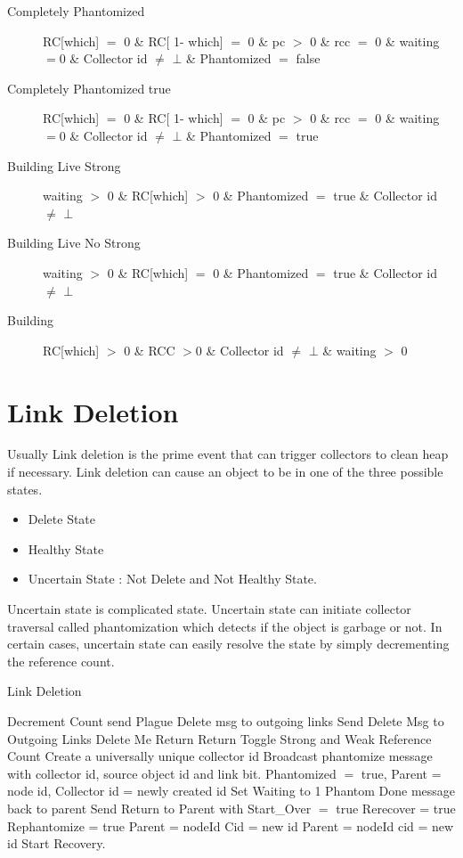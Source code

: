 \documentclass{article}
\begin{document}
\begin{description}
\item[Completely Phantomized] RC[which] $=$ 0 \& RC[ 1- which] $=$ 0 \& pc $>$ 0 \& rcc $=$ 0 \& waiting $=$0 \& Collector id $\neq$ $\bot$ \& Phantomized $=$ false
\item[Completely Phantomized true] RC[which] $=$ 0 \& RC[ 1- which] $=$ 0 \& pc $>$ 0 \& rcc $=$ 0 \& waiting $=$0 \& Collector id $\neq$ $\bot$ \& Phantomized $=$ true
\item[Building Live Strong] waiting $>$ 0 \& RC[which] $>$ 0 \& Phantomized $=$ true \& Collector id $\neq$ $\bot$
\item[Building Live No Strong] waiting $>$ 0 \& RC[which] $=$ 0 \& Phantomized $=$ true \& Collector id $\neq$ $\bot$
   \item[Building] RC[which] $>$ 0 \& RCC $>$0 \& Collector id $\neq$ $\bot$ \& waiting $>$ 0

\end{description}
\section{Link Deletion}
	Usually Link deletion is the prime event that can trigger collectors to clean heap if necessary. Link deletion can cause an object to be in one of the three possible states. 
\begin{itemize}
  \item Delete State
  \item Healthy State
  \item Uncertain State : Not Delete and Not Healthy State.
\end{itemize}
	Uncertain state is complicated state. Uncertain state can initiate collector traversal called phantomization which detects if the object is garbage or not. In certain cases, uncertain state can easily resolve the state by simply decrementing the reference count. 

\begin{algorithm}
\caption{Link Deletion}
\label{Link Deletion}
\begin{algorithmic}[1]
\State Decrement Count
		\State send Plague Delete msg to outgoing links
	\EndIf
		\State Send Delete Msg to Outgoing Links
		\State Delete Me
		\State Return
		\State Return
		\State Toggle Strong and Weak Reference Count
		\State Create a universally unique collector id
			\State Broadcast phantomize message with collector id, source object id and link bit.
		\EndFor
		\State Phantomized $=$ true, Parent = node id, Collector id = newly created id
			\State Set Waiting to 1
		\State Phantom Done message back to parent
		\EndIf
	\Else
			\State Send Return to Parent with Start\_Over $=$ true
			\State Rerecover = true
			\State Rephantomize = true
			\State Parent = nodeId
			\State Cid = new id
		\Else
			\State Parent = nodeId
			\State cid = new id
			\State Start Recovery.
		\EndIf
	\EndIf
\EndProcedure
\end{algorithmic}
\end{algorithm}	
\end{document}
